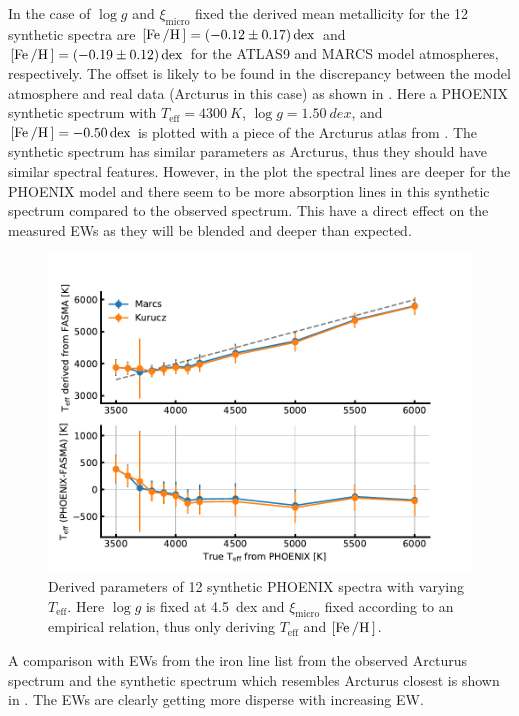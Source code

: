 In the case of $\log g$ and $\xi_\mathrm{micro}$ fixed the derived mean metallicity for the 12
synthetic spectra are $[\ion{Fe}/\ion{H}]=\SI{-0.12(17)}{dex}$ and
$[\ion{Fe}/\ion{H}]=\SI{-0.19(12)}{dex}$ for the ATLAS9 and MARCS model atmospheres, respectively.
The offset is likely to be found in the discrepancy between the model atmosphere and real data
(Arcturus in this case) as shown in . Here a PHOENIX synthetic spectrum
with $T_\mathrm{eff}=\SI{4300}{K}$, $\log g=\SI{1.50}{dex}$, and
$[\ion{Fe}/\ion{H}]=\SI{-0.50}{dex}$ is plotted with a piece of the Arcturus atlas from
. The synthetic spectrum has similar parameters as Arcturus, thus they should
have similar spectral features. However, in the plot the spectral lines are deeper for the PHOENIX
model and there seem to be more absorption lines in this synthetic spectrum compared to the observed
spectrum. This have a direct effect on the measured EWs as they will be blended and deeper than
expected.


\begin{figure}[htpb!]
    \centering
    \includegraphics[width=1.0\linewidth]{figures/simulated_teff_fix.pdf}
    \caption{Derived parameters of 12 synthetic PHOENIX spectra with varying $T_\mathrm{eff}$. Here
             $\log g$ is fixed at \SI{4.5}{dex} and $\xi_\mathrm{micro}$ fixed according to an
             empirical relation, thus only deriving $T_\mathrm{eff}$ and $[\ion{Fe}/\ion{H}]$.}
    \label{fig:phoenix_fix}
\end{figure}

A comparison with EWs from the iron line list from the observed Arcturus spectrum and the
synthetic spectrum which resembles Arcturus closest is shown in . The EWs are
clearly getting more disperse with increasing EW.

